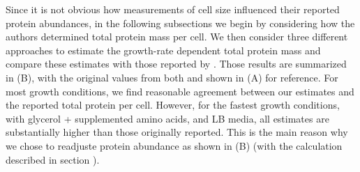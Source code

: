 \begin{figure}
\end{figure}

Since it is not obvious how measurements of cell size influenced their reported
protein abundances, in the following subsections we begin by considering how the
authors determined total protein mass per cell. We then consider three different
approaches to estimate the growth-rate dependent total protein mass and compare
these estimates with those reported by \cite{schmidt2016}. Those results are
summarized in (B), with the original values from both
\cite{schmidt2016} and \cite{li2014} shown in (A) for
reference. For most growth conditions, we find reasonable agreement between  our
estimates and the reported total protein per cell. However, for the fastest
growth conditions, with glycerol + supplemented amino acids, and LB media, all
estimates are substantially higher than those originally reported. This is the
main reason why we chose to readjuste protein abundance as shown in
(B) (with the calculation described in section
).


